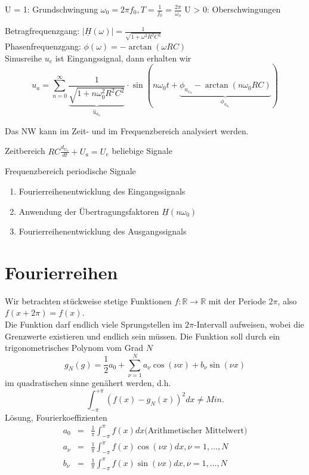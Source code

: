 \documentclass[german]{article}
\begin{document}
U = 1: Grundschwingung
	$\omega_0 = 2 \pi f_0, T = \frac1{f_0} = \frac{2\pi}{\omega_o}$
U > 0: Oberschwingungen

Betragfrequenzgang: $|\underline{H}(\omega)| = \frac1{\sqrt{1 + \omega^2 R^2 C^2}}$ \\
Phasenfrequenzgang: $\phi(\omega) = - \arctan(\omega R C)$ \\
Sinusreihe $u_e$ ist Eingangssignal, dann erhalten wir
\[ u_a = \sum_{n=0}^\infty \frac1{\underbrace{\sqrt{1 + n\omega_0^2 R^2 C^2}}_{\hat{u}_{a_n}}} \cdot \sin(n \omega_0 t + \underbrace{\phi_{u_{e_n}} - \arctan(n \omega_0 R C)}_{\phi_{u_{a_n}}}) \]

Das NW kann im Zeit- und im Frequenzbereich analysiert werden.

Zeitbereich
$RC \frac{d_{U_a}}{dt} + U_a = U_e$
beliebige Signale

Frequenzbereich
periodische Signale
\begin{enumerate}
	\item Fourierreihenentwicklung des Eingangssignals
	\item Anwendung der Übertragungsfaktoren $\underline{H}(n\omega_0)$
	\item Fourierreihenentwicklung des Ausgangssignals
\end{enumerate}


\section{Fourierreihen}
Wir betrachten stückweise stetige Funktionen $f: \mathbb{R} \rightarrow \mathbb{R}$ mit der Periode $2\pi$, also $f(x+2\pi) = f(x)$. \\
Die Funktion darf endlich viele Sprungstellen im $2\pi$-Intervall aufweisen, wobei die Grenzwerte existieren und endlich sein müssen. Die Funktion soll durch ein trigonometrisches Polynom vom Grad $N$
\[ g_N(g) = \frac12 a_0 + \sum_{\nu = 1}^N a_\nu \cos(\nu x) + b_\nu \sin(\nu x)\]
im quadratischen sinne genähert werden, d.h.
\[ \int_{-\pi}^{+\pi} (f(x) - g_N(x))^2 dx \not = Min. \]
Lösung, Fourierkoeffizienten
\begin{eqnarray*}
	a_0 & = & \frac1{\pi} \int_{-\pi}^{\pi} f(x) dx \text{(Arithmetischer Mittelwert)} \\
	a_\nu & = & \frac1{\pi} \int_{-\pi}^{\pi} f(x) \cos(\nu x) dx, \nu = 1, \ldots, N \\
	b_\nu & = & \frac1{\pi} \int_{-\pi}^{\pi} f(x) \sin(\nu x) dx, \nu = 1, \ldots, N \\
\end{eqnarray*}
\end{document}
